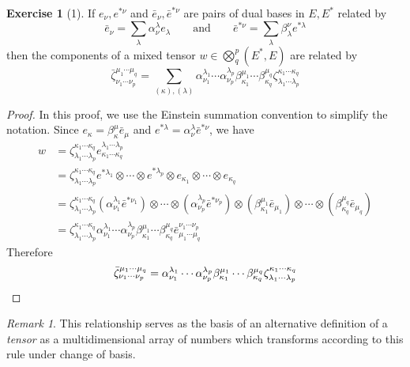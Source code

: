 \documentclass[letterpaper,12pt]{article}
\newcommand{\tprod}{\otimes}
\newcommand{\bigtprod}{\bigotimes}
\newcommand{\medtprod}{{\textstyle\bigtprod}}
\theoremstyle{definition}
\newtheorem*{exer}{Exercise}
\theoremstyle{remark}
\newtheorem*{rmk}{Remark}
\begin{document}
\begin{exer}[1]
If \(e_{\nu},e^{*\nu}\) and \(\bar{e}_{\nu},\bar{e}^{*\nu}\) are pairs of dual bases in \(E,E^*\) related by
\[\bar{e}_{\nu}=\sum_{\lambda}\alpha_{\nu}^{\lambda}e_{\lambda}\qquad\text{and}\qquad\bar{e}^{*\nu}=\sum_{\lambda}\beta^{\nu}_{\lambda}e^{*\lambda}\]
then the components of a mixed tensor \(w\in\medtprod^p_q(E^*,E)\) are related by
\[\bar{\zeta}^{\mu_1\cdots\mu_q}_{\nu_1\cdots\nu_p}=\sum_{(\kappa),(\lambda)}\alpha_{\nu_1}^{\lambda_1}\cdots\alpha_{\nu_p}^{\lambda_p}\beta^{\mu_1}_{\kappa_1}\cdots\beta^{\mu_q}_{\kappa_q}\zeta^{\kappa_1\cdots\kappa_q}_{\lambda_1\cdots\lambda_p}\]
\end{exer}
\begin{proof}
In this proof, we use the Einstein summation convention to simplify the notation. Since \(e_{\kappa}=\beta_{\kappa}^{\mu}\bar{e}_{\mu}\) and \(e^{*\lambda}=\alpha^{\lambda}_{\nu}\bar{e}^{*\nu}\), we have
\begin{align*}
w&=\zeta^{\kappa_1\cdots\kappa_q}_{\lambda_1\cdots\lambda_p}e^{\lambda_1\cdots\lambda_p}_{\kappa_1\cdots\kappa_q}\\
	&=\zeta^{\kappa_1\cdots\kappa_q}_{\lambda_1\cdots\lambda_p}e^{*\lambda_1}\tprod\cdots\tprod e^{*\lambda_p}\tprod e_{\kappa_1}\tprod\cdots\tprod e_{\kappa_q}\\
	&=\zeta^{\kappa_1\cdots\kappa_q}_{\lambda_1\cdots\lambda_p}(\alpha^{\lambda_1}_{\nu_1}\bar{e}^{*\nu_1})\tprod\cdots\tprod(\alpha^{\lambda_p}_{\nu_p}\bar{e}^{*\nu_p})\tprod(\beta_{\kappa_1}^{\mu_1}\bar{e}_{\mu_1})\tprod\cdots\tprod(\beta_{\kappa_q}^{\mu_q}\bar{e}_{\mu_q})\\
	&=\zeta^{\kappa_1\cdots\kappa_q}_{\lambda_1\cdots\lambda_p}\alpha^{\lambda_1}_{\nu_1}\cdots\alpha^{\lambda_p}_{\nu_p}\beta_{\kappa_1}^{\mu_1}\cdots\beta_{\kappa_q}^{\mu_q}\bar{e}^{\nu_1\cdots\nu_p}_{\mu_1\cdots\mu_q}
\end{align*}
Therefore
\[\bar{\zeta}^{\mu_1\cdots\mu_q}_{\nu_1\cdots\nu_p}=\alpha_{\nu_1}^{\lambda_1}\cdots\alpha_{\nu_p}^{\lambda_p}\beta^{\mu_1}_{\kappa_1}\cdots\beta^{\mu_q}_{\kappa_q}\zeta^{\kappa_1\cdots\kappa_q}_{\lambda_1\cdots\lambda_p}\qedhere\]
\end{proof}
\begin{rmk}
This relationship serves as the basis of an alternative definition of a \emph{tensor} as a multidimensional array of numbers which transforms according to this rule under change of basis.
\end{rmk}
\end{document}
